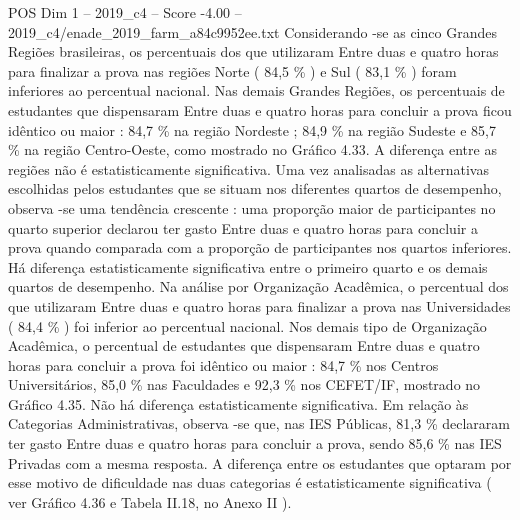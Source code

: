 \begin{textsample}{POS Dim 1 – 2019\_c4 – Score -4.00 – 2019\_c4/enade\_2019\_farm\_a84c9952ee.txt}
Considerando -se as cinco Grandes Regiões brasileiras, os percentuais dos que utilizaram Entre duas e quatro horas para finalizar a prova nas regiões Norte ( 84,5 \% ) e Sul ( 83,1 \% ) foram inferiores ao percentual nacional.
Nas demais Grandes Regiões, os percentuais de estudantes que dispensaram Entre duas e quatro horas para concluir a prova ficou idêntico ou maior : 84,7 \% na região Nordeste ; 84,9 \% na região Sudeste e 85,7 \% na região Centro-Oeste, como mostrado no Gráfico 4.33.
A diferença entre as regiões não é estatisticamente significativa.
Uma vez analisadas as alternativas escolhidas pelos estudantes que se situam nos diferentes quartos de desempenho, observa -se uma tendência crescente : uma proporção maior de participantes no quarto superior declarou ter gasto Entre duas e quatro horas para concluir a prova quando comparada com a proporção de participantes nos quartos inferiores.
Há diferença estatisticamente significativa entre o primeiro quarto e os demais quartos de desempenho.
Na análise por Organização Acadêmica, o percentual dos que utilizaram Entre duas e quatro horas para finalizar a prova nas Universidades ( 84,4 \% ) foi inferior ao percentual nacional.
Nos demais tipo de Organização Acadêmica, o percentual de estudantes que dispensaram Entre duas e quatro horas para concluir a prova foi idêntico ou maior : 84,7 \% nos Centros Universitários, 85,0 \% nas Faculdades e 92,3 \% nos CEFET/IF, mostrado no Gráfico 4.35.
Não há diferença estatisticamente significativa.
Em relação às Categorias Administrativas, observa -se que, nas IES Públicas, 81,3 \% declararam ter gasto Entre duas e quatro horas para concluir a prova, sendo 85,6 \% nas IES Privadas com a mesma resposta.
A diferença entre os estudantes que optaram por esse motivo de dificuldade nas duas categorias é estatisticamente significativa ( ver Gráfico 4.36 e Tabela II.18, no Anexo II ).

\end{textsample}
